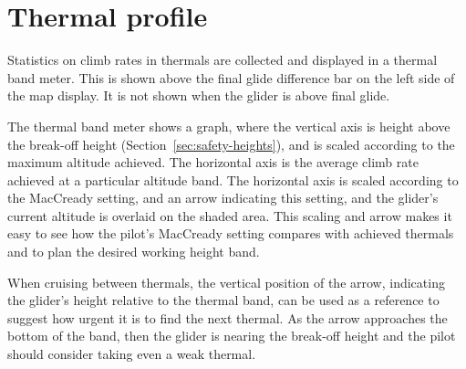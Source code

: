 \section{Thermal profile}

Statistics on climb rates in thermals are collected and displayed in a
thermal band meter.  This is shown above the final glide difference
bar on the left side of the map display.  It is not shown when the
glider is above final glide.  

The thermal band meter shows a graph, where the vertical axis is
height above the break-off height (Section~\ref{sec:safety-heights}), and is
scaled according to the maximum altitude achieved.  The horizontal axis is the average climb
rate achieved at a particular altitude band.  The horizontal axis is
scaled according to the MacCready setting, and an arrow indicating this
setting, and the glider's current altitude is overlaid on the shaded
area.  This scaling and arrow makes it easy to see how the pilot's
MacCready setting compares with achieved thermals and to plan the
desired working height band.


When cruising between thermals, the vertical position of the arrow,
indicating the glider's height relative to the thermal band, can be
used as a reference to suggest how urgent it is to find the next
thermal.  As the arrow approaches the bottom of the band, then the
glider is nearing the break-off height and the pilot should consider
taking even a weak thermal.

